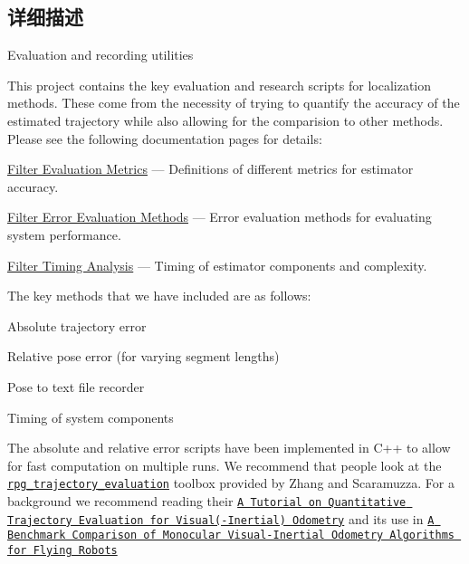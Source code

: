 \subsection{详细描述}
Evaluation and recording utilities 

This project contains the key evaluation and research scripts for localization methods. These come from the necessity of trying to quantify the accuracy of the estimated trajectory while also allowing for the comparision to other methods. Please see the following documentation pages for details\+:


\begin{DoxyItemize}
\item \hyperlink{eval-metrics}{Filter Evaluation Metrics} --- Definitions of different metrics for estimator accuracy.
\item \hyperlink{eval-error}{Filter Error Evaluation Methods} --- Error evaluation methods for evaluating system performance.
\item \hyperlink{eval-timing}{Filter Timing Analysis} --- Timing of estimator components and complexity.
\end{DoxyItemize}

The key methods that we have included are as follows\+:


\begin{DoxyItemize}
\item Absolute trajectory error
\item Relative pose error (for varying segment lengths)
\item Pose to text file recorder
\item Timing of system components
\end{DoxyItemize}

The absolute and relative error scripts have been implemented in C++ to allow for fast computation on multiple runs. We recommend that people look at the \href{https://github.com/uzh-rpg/rpg_trajectory_evaluation}{\tt rpg\+\_\+trajectory\+\_\+evaluation} toolbox provided by Zhang and Scaramuzza. For a background we recommend reading their \href{http://rpg.ifi.uzh.ch/docs/IROS18_Zhang.pdf}{\tt A Tutorial on Quantitative Trajectory Evaluation for Visual(-\/\+Inertial) Odometry} \cite{Zhang2018IROS} and its use in \href{http://rpg.ifi.uzh.ch/docs/ICRA18_Delmerico.pdf}{\tt A Benchmark Comparison of Monocular Visual-\/\+Inertial Odometry Algorithms for Flying Robots} \cite{Delmerico2018ICRA} 